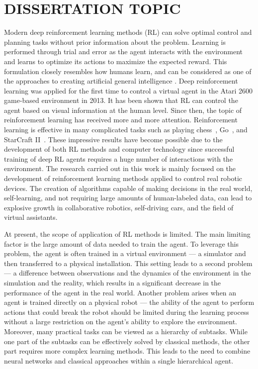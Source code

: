 \section*{\centering DISSERTATION TOPIC}

\renewcommand{\figurename}{Figure}
\renewcommand{\tablename}{Table}
\renewcommand{\bibtitlefull}{References}

Modern deep reinforcement learning methods (RL) can solve optimal control and planning tasks without prior information about the problem. Learning is performed through trial and error as the agent interacts with the environment and learns to optimize its actions to maximize the expected reward. This formulation closely resembles how humans learn, and can be considered as one of the approaches to creating artificial general intelligence \cite{reward_is_enough}. Deep reinforcement learning was applied for the first time to control a virtual agent in the Atari 2600 game-based environment in 2013\cite{mnih2013atari}. It has been shown that RL can control the agent based on visual information at the human level. Since then, the topic of reinforcement learning has received more and more attention. Reinforcement learning is effective in many complicated tasks such as playing chess~\cite{alphazero}, Go~\cite{alphago}, and StarCraft II~\cite{alphastar}. These impressive results have become possible due to the development of both RL methods and computer technology since successful training of deep RL agents requires a huge number of interactions with the environment. The research carried out in this work is mainly focused on the development of reinforcement learning methods applied to control real robotic devices. The creation of algorithms capable of making decisions in the real world, self-learning, and not requiring large amounts of human-labeled data, can lead to explosive growth in collaborative robotics, self-driving cars, and the field of virtual assistants.

At present, the scope of application of RL methods is limited. The main limiting factor is the large amount of data needed to train the agent. To leverage this problem, the agent is often trained in a virtual environment --- a simulator and then transferred to a physical installation. This setting leads to a second problem --- a difference between observations and the dynamics of the environment in the simulation and the reality, which results in a significant decrease in the performance of the agent in the real world. Another problem arises when an agent is trained directly on a physical robot --- the ability of the agent to perform actions that could break the robot should be limited during the learning process without a large restriction on the agent's ability to explore the environment. Moreover, many practical tasks can be viewed as a hierarchy of subtasks. While one part of the subtasks can be effectively solved by classical methods, the other part requires more complex learning methods. This leads to the need to combine neural networks and classical approaches within a single hierarchical agent.

